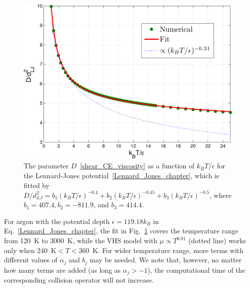 \begin{figure}[t]
	\centering
	\includegraphics[scale=0.6]{Chapter4/IMG/shear_LJ3.pdf}
	\caption{
		The parameter $D$~\eqref{shear_CE_viscosity} as a function of $k_BT/\epsilon$ for the Lennard-Jones potential~\eqref{Lennard_Jones_chapter}, which is fitted by $D/d_{LJ}^2=b_1(k_BT/\epsilon)^{-0.4} +b_2(k_BT/\epsilon)^{-0.45}+b_3(k_BT/\epsilon)^{-0.5}$, where $b_1=407.4, b_2=-811.9$, and $b_3=414.4$. }
	\label{shear_LJ}
\end{figure}


For argon with the potential depth $\epsilon=119.18k_B$ in Eq.~\eqref{Lennard_Jones_chapter}, the fit in Fig.~\ref{shear_LJ} covers the temperature range from 120~K to 3000~K, while the VHS model with $\mu\propto T^{0.81}$ (dotted line) works only when 240~K$<T<$360~K. For wider temperature range, more terms with different values of $\alpha_j$ and $b_j$ may be needed. We note that, however, no matter how many terms are added (as long as $\alpha_j>-1$), the computational time of the corresponding collision operator will not increase. %






